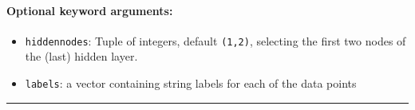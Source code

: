 \paragraph*{Optional keyword arguments:}
\begin{itemize}
\item \texttt{hiddennodes}: Tuple of integers, default \texttt{(1,2)}, selecting the first two nodes of the (last) hidden layer.


\item \texttt{labels}: a vector containing string labels for each of the data points

\end{itemize}
\noindent\rule{\textwidth}{1pt}
